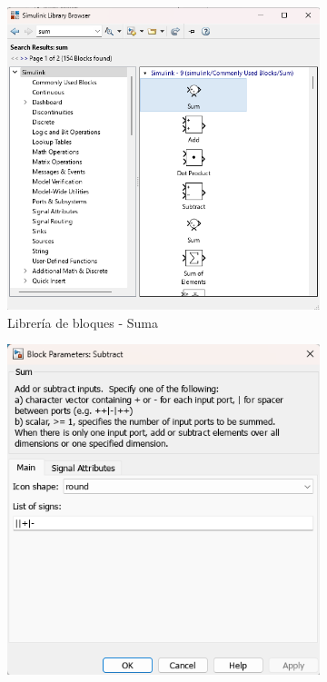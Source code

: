 \begin{figure}[htbp]
    \centering
    \begin{subfigure}[b]{0.35\textwidth}
        \centering
        \includegraphics[width=\textwidth]{fig/Capitulo5/Caso_de_estudio_IMU/Generador_de_salidas/libreia_de_bloques_suma.png}
        \caption{Librería de bloques - Suma}
        \label{fig:lib_bloques_add_IMU}
    \end{subfigure}
    \hfill
    \begin{subfigure}[b]{0.45\textwidth}
        \centering
        \includegraphics[width=\textwidth]{fig/Capitulo5/Caso_de_estudio_IMU/Generador_de_salidas/configuracion_bloque_suma.png}

\end{subfigure}
\end{figure}
